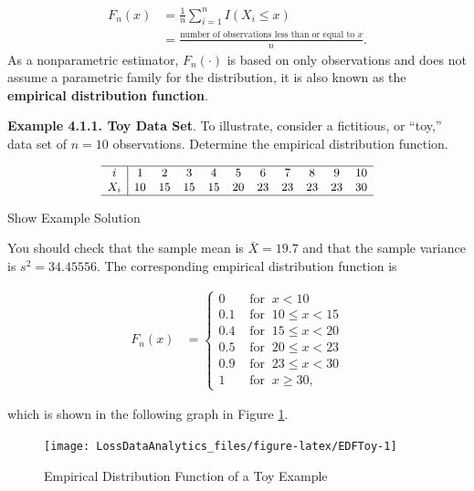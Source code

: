 \documentclass[]{book}
\theoremstyle{definition}
\theoremstyle{definition}
\theoremstyle{definition}
\theoremstyle{remark}
\begin{document}
\[
\begin{aligned}
F_n(x)
&=  \frac{1}{n} \sum_{i=1}^n I\left(X_i \le x\right) \\
&=  \frac{\text{number of observations less than or equal to }x}{n} . 
\end{aligned}
\] As a nonparametric estimator, \(F_n(\cdot)\) is based on only
observations and does not assume a parametric family for the
distribution, it is also known as the \textbf{empirical distribution
function}.

\textbf{Example 4.1.1. Toy Data Set}. To illustrate, consider a
fictitious, or ``toy,'' data set of \(n=10\) observations. Determine the
empirical distribution function.

\[
{\small
\begin{array}{c|cccccccccc}
\hline
i &1&2&3&4&5&6&7&8&9&10 \\
X_i& 10 &15 &15 &15 &20 &23 &23 &23 &23 &30\\
\hline
\end{array}
}
\]

Show Example Solution

\hypertarget{toggleExampleSelect.1.1}{}
You should check that the sample mean is \(\bar{X} = 19.7\) and that the
sample variance is \(s^2 =34.45556\). The corresponding empirical
distribution function is

\[
\begin{aligned}
F_n(x) &=
\left\{
\begin{array}{ll}
0 & \text{ for }\ x<10 \\
0.1 & \text{ for }\ 10 \leq x<15 \\
0.4 & \text{ for }\ 15 \leq x<20 \\
0.5 & \text{ for }\ 20 \leq x<23 \\
0.9 & \text{ for }\ 23 \leq x<30 \\
1 & \text{ for }\ x \geq 30,
\end{array}
\right.\end{aligned}
\]

which is shown in the following graph in Figure \ref{fig:EDFToy}.

\begin{figure}

{\centering \texttt{[image: LossDataAnalytics\_files/figure-latex/EDFToy-1]} 

}

\caption{Empirical Distribution Function of a Toy Example}\label{fig:EDFToy}
\end{figure}
\end{document}
